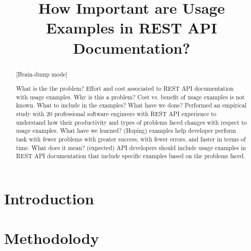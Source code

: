 \documentclass[conference]{IEEEtran}
\begin{document}
\title{How Important are Usage Examples in REST API Documentation?}

\author{
\and
{}
\and
{}
}

\maketitle

\begin{abstract}

[Brain-dump mode]

What is the the problem? Effort and cost associated to REST API documentation with usage examples.
Why is this a problem? Cost vs. benefit of usage examples is not known. What to include in the examples?
What have we done? Performed an empirical study with 20 professional software engineers with REST API experience to understand how their productivity and types of problems faced changes with respect to usage examples.
What have we learned? (Hoping) examples help developer perform task with fewer problems with greater success, with fewer errors, and faster in terms of time.
What does it mean? (expected) API developers should include usage examples in REST API documentation that include specific examples based on the problems faced.


\end{abstract}


\IEEEpeerreviewmaketitle

\section{Introduction}
\section{Methodolody}
\end{document}
